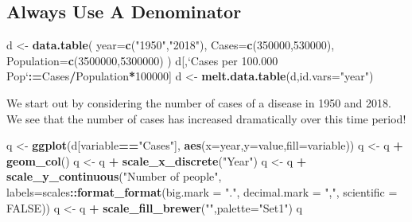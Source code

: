 \documentclass[]{book}
\newenvironment{Shaded}{\begin{snugshade}}{\end{snugshade}}
\newcommand{\KeywordTok}[1]{\textcolor[rgb]{0.13,0.29,0.53}{\textbf{#1}}}
\newcommand{\DataTypeTok}[1]{\textcolor[rgb]{0.13,0.29,0.53}{#1}}
\newcommand{\DecValTok}[1]{\textcolor[rgb]{0.00,0.00,0.81}{#1}}
\newcommand{\StringTok}[1]{\textcolor[rgb]{0.31,0.60,0.02}{#1}}
\newcommand{\OtherTok}[1]{\textcolor[rgb]{0.56,0.35,0.01}{#1}}
\newcommand{\OperatorTok}[1]{\textcolor[rgb]{0.81,0.36,0.00}{\textbf{#1}}}
\newcommand{\ErrorTok}[1]{\textcolor[rgb]{0.64,0.00,0.00}{\textbf{#1}}}
\newcommand{\NormalTok}[1]{#1}
\begin{document}
\subsection{Always Use A Denominator}\label{always-use-a-denominator}

\begin{Shaded}
\begin{Highlighting}[]
\NormalTok{d <-}\StringTok{ }\KeywordTok{data.table}\NormalTok{(}
  \DataTypeTok{year=}\KeywordTok{c}\NormalTok{(}\StringTok{"1950"}\NormalTok{,}\StringTok{"2018"}\NormalTok{),}
  \DataTypeTok{Cases=}\KeywordTok{c}\NormalTok{(}\DecValTok{350000}\NormalTok{,}\DecValTok{530000}\NormalTok{),}
  \DataTypeTok{Population=}\KeywordTok{c}\NormalTok{(}\DecValTok{3500000}\NormalTok{,}\DecValTok{5300000}\NormalTok{)}
\NormalTok{)}
\NormalTok{d[,}\StringTok{`}\DataTypeTok{Cases per 100.000 Pop}\StringTok{`}\OperatorTok{:}\ErrorTok{=}\NormalTok{Cases}\OperatorTok{/}\NormalTok{Population}\OperatorTok{*}\DecValTok{100000}\NormalTok{]}
\NormalTok{d <-}\StringTok{ }\KeywordTok{melt.data.table}\NormalTok{(d,}\DataTypeTok{id.vars=}\StringTok{"year"}\NormalTok{)}
\end{Highlighting}
\end{Shaded}

We start out by considering the number of cases of a disease in 1950 and
2018. We see that the number of cases has increased dramatically over
this time period!

\begin{Shaded}
\begin{Highlighting}[]
\NormalTok{q <-}\StringTok{ }\KeywordTok{ggplot}\NormalTok{(d[variable}\OperatorTok{==}\StringTok{"Cases"}\NormalTok{], }\KeywordTok{aes}\NormalTok{(}\DataTypeTok{x=}\NormalTok{year,}\DataTypeTok{y=}\NormalTok{value,}\DataTypeTok{fill=}\NormalTok{variable))}
\NormalTok{q <-}\StringTok{ }\NormalTok{q }\OperatorTok{+}\StringTok{ }\KeywordTok{geom_col}\NormalTok{()}
\NormalTok{q <-}\StringTok{ }\NormalTok{q }\OperatorTok{+}\StringTok{ }\KeywordTok{scale_x_discrete}\NormalTok{(}\StringTok{"Year"}\NormalTok{)}
\NormalTok{q <-}\StringTok{ }\NormalTok{q }\OperatorTok{+}\StringTok{ }\KeywordTok{scale_y_continuous}\NormalTok{(}\StringTok{"Number of people"}\NormalTok{, }\DataTypeTok{labels=}\NormalTok{scales}\OperatorTok{::}\KeywordTok{format_format}\NormalTok{(}\DataTypeTok{big.mark =} \StringTok{"."}\NormalTok{, }\DataTypeTok{decimal.mark =} \StringTok{","}\NormalTok{, }\DataTypeTok{scientific =} \OtherTok{FALSE}\NormalTok{))}
\NormalTok{q <-}\StringTok{ }\NormalTok{q }\OperatorTok{+}\StringTok{ }\KeywordTok{scale_fill_brewer}\NormalTok{(}\StringTok{""}\NormalTok{,}\DataTypeTok{palette=}\StringTok{"Set1"}\NormalTok{)}
\NormalTok{q}
\end{Highlighting}
\end{Shaded}
\end{document}
